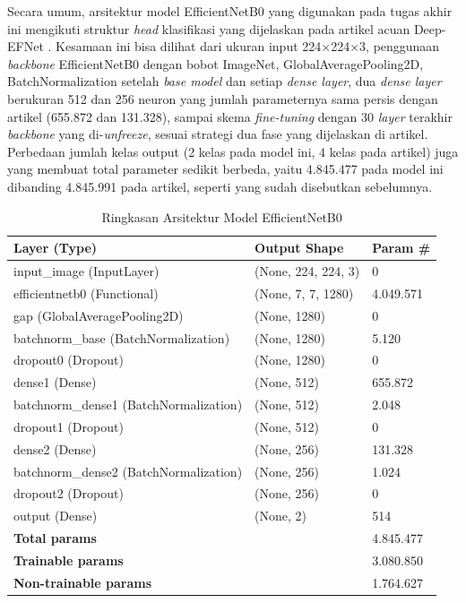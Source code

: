 Secara umum, arsitektur model EfficientNetB0 yang digunakan pada tugas akhir ini mengikuti struktur \textit{head} klasifikasi yang dijelaskan pada artikel acuan Deep-EFNet \textcite{alshaari2025deepefnet}. Kesamaan ini bisa dilihat dari ukuran input 224×224×3, penggunaan \textit{backbone} EfficientNetB0 dengan bobot ImageNet, GlobalAveragePooling2D, BatchNormalization setelah \textit{base model} dan setiap \textit{dense layer}, dua \textit{dense layer} berukuran 512 dan 256 neuron yang jumlah parameternya sama persis dengan artikel (655.872 dan 131.328), sampai skema \textit{fine-tuning} dengan 30 \textit{layer} terakhir \textit{backbone} yang di-\textit{unfreeze}, sesuai strategi dua fase yang dijelaskan di artikel. Perbedaan jumlah kelas output (2 kelas pada model ini, 4 kelas pada artikel) juga yang membuat total parameter sedikit berbeda, yaitu 4.845.477 pada model ini dibanding 4.845.991 pada artikel, seperti yang sudah disebutkan sebelumnya.

\begin{table}[htbp]
	\centering
	\caption{Ringkasan Arsitektur Model EfficientNetB0}
	\label{tab:arsitektur_model}
	\begin{tabular}{|l|l|l|}
			\hline
			\textbf{Layer (Type)} & \textbf{Output Shape} & \textbf{Param \#} \\ \hline
			input\_image (InputLayer) & (None, 224, 224, 3) & 0 \\ \hline
			efficientnetb0 (Functional) & (None, 7, 7, 1280) & 4.049.571 \\ \hline
			gap (GlobalAveragePooling2D) & (None, 1280) & 0 \\ \hline
			batchnorm\_base (BatchNormalization) & (None, 1280) & 5.120 \\ \hline
			dropout0 (Dropout) & (None, 1280) & 0 \\ \hline
			dense1 (Dense) & (None, 512) & 655.872 \\ \hline
			batchnorm\_dense1 (BatchNormalization) & (None, 512) & 2.048 \\ \hline
			dropout1 (Dropout) & (None, 512) & 0 \\ \hline
			dense2 (Dense) & (None, 256) & 131.328 \\ \hline
			batchnorm\_dense2 (BatchNormalization) & (None, 256) & 1.024 \\ \hline
			dropout2 (Dropout) & (None, 256) & 0 \\ \hline
			output (Dense) & (None, 2) & 514 \\ \hline
			\multicolumn{2}{|l|}{\textbf{Total params}} & 4.845.477 \\ \hline
			\multicolumn{2}{|l|}{\textbf{Trainable params}} & 3.080.850 \\ \hline
			\multicolumn{2}{|l|}{\textbf{Non-trainable params}} & 1.764.627 \\ \hline
		\end{tabular}
	\vspace{4pt}
\end{table}

